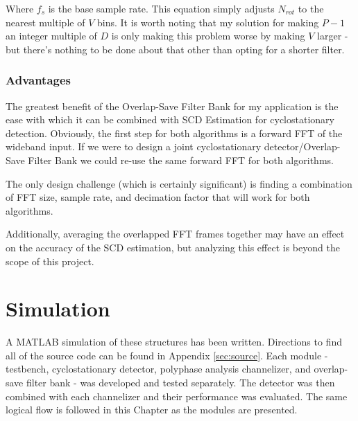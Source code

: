 \documentclass[12pt]{report}
\begin{document}
Where $f_s$ is the base sample rate. This equation simply adjusts $N_{rot}$ to
the nearest multiple of $V$ bins. It is worth noting that my solution for
making $P-1$ an integer multiple of $D$ is only making this problem worse by
making $V$ larger - but there's nothing to be done about that other than opting
for a shorter filter.

\subsection{Advantages}
\label{sec:os_advantages}

The greatest benefit of the Overlap-Save Filter Bank for my application is
the ease with which it can be combined with SCD Estimation for cyclostationary
detection. Obviously, the first step for both algorithms is a forward FFT of the
wideband input. If we were to design a joint cyclostationary
detector/Overlap-Save Filter Bank we could re-use the same forward FFT for both
algorithms.

The only design challenge (which is certainly significant) is finding
a combination of FFT size, sample rate, and decimation factor that will work
for both algorithms.



Additionally, averaging the overlapped FFT frames together may have an effect
on the accuracy of the SCD estimation, but analyzing this effect is beyond the
scope of this project.

\chapter{Simulation}
\label{sec:sim}
A MATLAB simulation of these structures has been written. Directions to find
all of the source code can be found in Appendix \ref{sec:source}. Each module
- testbench, cyclostationary detector, polyphase analysis channelizer, and
overlap-save filter bank - was developed and tested separately. The detector
was then combined with each channelizer and their performance was evaluated.
The same logical flow is followed in this Chapter as the modules are presented.
\end{document}
